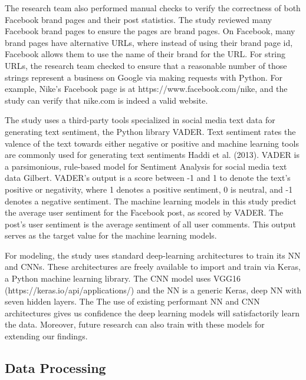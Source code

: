\documentclass[mksc,blindrev]{informs3} %
\begin{document}
The research team also performed manual checks to verify the correctness of both Facebook brand pages and their post statistics. The study reviewed many Facebook brand pages to ensure the pages are brand pages. On Facebook, many brand pages have alternative URLs, where instead of using their brand page id, Facebook allows them to use the name of their brand for the URL. For string URLs, the research team checked to ensure that a reasonable number of those strings represent a business on Google via making requests with Python. For example, Nike's Facebook page is at https://www.facebook.com/nike, and the study can verify that nike.com is indeed a valid website.

The study uses a third-party tools specialized in social media text data for generating text sentiment, the Python library VADER. Text sentiment rates the valence of the text towards either negative or positive and machine learning tools are commonly used for generating text sentiments Haddi et al. (2013). VADER is a parsimonious, rule-based model for Sentiment Analysis for social media text data Gilbert. VADER’s output is a score between -1 and 1 to denote the text’s positive or negativity, where 1 denotes a positive sentiment, 0 is neutral, and -1 denotes a negative sentiment. The machine learning models in this study predict the average user sentiment for the Facebook post, as scored by VADER. The post’s user sentiment is the average sentiment of all user comments. This output serves as the target value for the machine learning models.

For modeling, the study uses standard deep-learning architectures to train its NN and CNNs. These architectures are freely available to import and train via Keras, a Python machine learning library. The CNN model uses VGG16 (https://keras.io/api/applications/) and the NN is a generic Keras, deep NN with seven hidden layers. The The use of existing performant NN and CNN architectures gives us confidence the deep learning models will satisfactorily learn the data. Moreover, future research can also train with these models for extending our findings.

\subsection{Data Processing}
\end{document}
